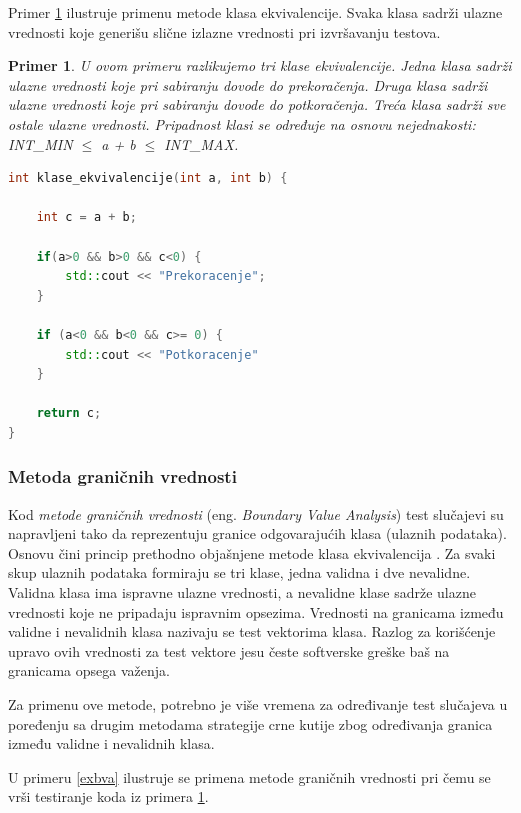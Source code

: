 \documentclass[12pt,oneside]{memoir}
\newtheorem{primer}{Primer}
\begin{document}
Primer \ref{exeq} ilustruje primenu metode klasa ekvivalencije.
Svaka klasa sadrži ulazne vrednosti koje generišu slične izlazne vrednosti pri izvršavanju testova.

\begin{primer} \label{exeq}U ovom primeru razlikujemo tri klase ekvivalencije. Jedna klasa sadrži ulazne vrednosti koje pri sabiranju dovode do prekoračenja. Druga klasa sadrži ulazne vrednosti koje pri sabiranju dovode do potkoračenja. Treća klasa sadrži sve ostale ulazne vrednosti. 
Pripadnost klasi se određuje na osnovu nejednakosti:
INT\_MIN $\leq$ a + b $\leq$ INT\_MAX.
\begin{lstlisting}[language=C++]
int klase_ekvivalencije(int a, int b) {
	
    int c = a + b;
    
    if(a>0 && b>0 && c<0) {
        std::cout << "Prekoracenje";
    } 
    
    if (a<0 && b<0 && c>= 0) {
        std::cout << "Potkoracenje"
    } 
    	
    return c;
}

\end{lstlisting}
\end{primer}

\subsubsection{Metoda graničnih vrednosti}
Kod \emph{metode graničnih  vrednosti} (eng. \textit{Boundary Value  Analysis}) test slučajevi su
napravljeni  tako  da  reprezentuju  granice  odgovarajućih 
klasa (ulaznih podataka). Osnovu čini princip prethodno objašnjene 
metode klasa ekvivalencija \cite{PartitioningBoundary}.
Za svaki skup ulaznih podataka formiraju se tri klase, jedna validna i dve nevalidne. Validna klasa ima ispravne ulazne vrednosti, a nevalidne klase sadrže ulazne vrednosti koje ne pripadaju ispravnim opsezima. Vrednosti na granicama između validne i nevalidnih klasa nazivaju se test vektorima klasa.
Razlog  za korišćenje upravo ovih vrednosti za test vektore jesu česte softverske greške baš na
granicama opsega važenja. 

Za primenu ove metode, potrebno je više vremena za određivanje test slučajeva u poređenju sa drugim metodama strategije crne kutije zbog određivanja granica između validne i nevalidnih klasa.
 
U primeru \ref{exbva} ilustruje se primena metode graničnih vrednosti pri čemu se vrši testiranje koda iz primera \ref{exeq}.
\end{document}
